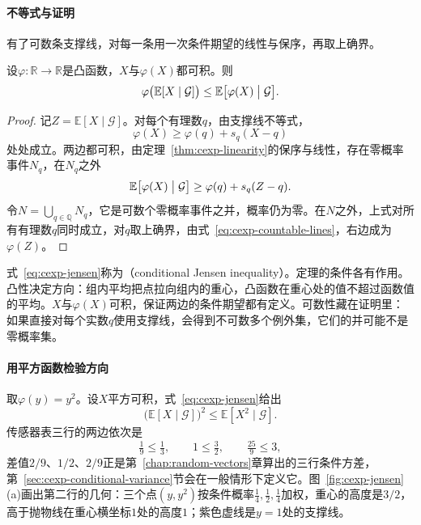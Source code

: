 \paragraph{不等式与证明}
有了可数条支撑线，对每一条用一次条件期望的线性与保序，再取上确界。

\begin{theorem}[条件Jensen不等式]
\label{thm:cexp-jensen}
设$\varphi:\mathbb{R}\to\mathbb{R}$是凸函数，$X$与$\varphi(X)$都可积。则
\begin{equation}
 \varphi\bigl(\mathbb{E}[X\mid\mathcal{G}]\bigr)\leq\mathbb{E}\bigl[\varphi(X)\bigm|\mathcal{G}\bigr].
 \label{eq:cexp-jensen}
\end{equation}
\end{theorem}

\begin{proof}
记$Z=\mathbb{E}[X\mid\mathcal{G}]$。对每个有理数$q$，由支撑线不等式，
\[
 \varphi(X)\geq\varphi(q)+s_q(X-q)
\]
处处成立。两边都可积，由定理~\ref{thm:cexp-linearity}的保序与线性，存在零概率事件$N_q$，在$N_q$之外
\[
 \mathbb{E}\bigl[\varphi(X)\bigm|\mathcal{G}\bigr]\geq\varphi(q)+s_q(Z-q).
\]
令$N=\bigcup_{q\in\mathbb{Q}}N_q$，它是可数个零概率事件之并，概率仍为零。在$N$之外，上式对所有有理数$q$同时成立，对$q$取上确界，由式~\eqref{eq:cexp-countable-lines}，右边成为$\varphi(Z)$。
\end{proof}

式~\eqref{eq:cexp-jensen}称为（conditional Jensen inequality）。定理的条件各有作用。凸性决定方向：组内平均把点拉向组内的重心，凸函数在重心处的值不超过函数值的平均。$X$与$\varphi(X)$可积，保证两边的条件期望都有定义。可数性藏在证明里：如果直接对每个实数$q$使用支撑线，会得到不可数多个例外集，它们的并可能不是零概率集。

\paragraph{用平方函数检验方向}
取$\varphi(y)=y^{2}$。设$X$平方可积，式~\eqref{eq:cexp-jensen}给出
\[
 \bigl(\mathbb{E}[X\mid\mathcal{G}]\bigr)^{2}\leq\mathbb{E}[X^{2}\mid\mathcal{G}] .
\]
传感器表三行的两边依次是
\[
 \tfrac19\leq\tfrac13,\qquad 1\leq\tfrac32,\qquad \tfrac{25}{9}\leq3 ,
\]
差值$2/9$、$1/2$、$2/9$正是第~\ref{chap:random-vectors}章算出的三行条件方差，第~\ref{sec:cexp-conditional-variance}节会在一般情形下定义它。图~\ref{fig:cexp-jensen}(a)画出第二行的几何：三个点$(y,y^{2})$按条件概率$\tfrac14,\tfrac12,\tfrac14$加权，重心的高度是$3/2$，高于抛物线在重心横坐标$1$处的高度$1$；紫色虚线是$y=1$处的支撑线。

